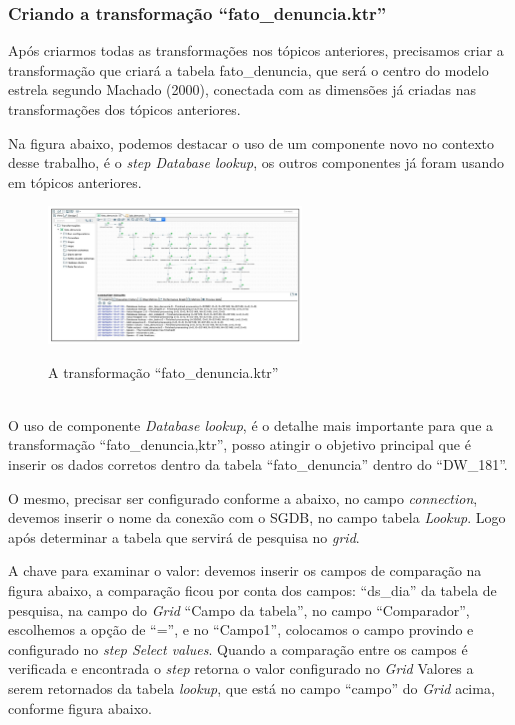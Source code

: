 \subsubsection{Criando a transforma\c{c}\~{a}o ``fato\_denuncia.ktr''}

Ap\'os criarmos todas as transforma\c{c}\~{o}es nos t\'opicos anteriores, precisamos criar a transforma\c{c}\~{a}o que criar\'{a} a tabela fato\_denuncia, que ser\'{a} o centro do modelo estrela segundo Machado (2000), conectada com as dimens\~{o}es j\'{a} criadas nas transforma\c{c}\~{o}es dos t\'opicos anteriores.

Na figura abaixo, podemos destacar o uso de um componente novo no contexto desse trabalho, \'{e} o 
\textit{step Database lookup}, os outros componentes j\'{a} foram usando em t\'opicos anteriores.

\begin{figure}[H]
	\vspace*{0,2cm}
    \centering
    \caption{A transforma\c{c}\~{a}o ``fato\_denuncia.ktr''}
    \includegraphics[width=0.6\textwidth]{./04-figuras/figura-fato}
    \label{fig:ilustfigfato}
\end{figure}
\vspace*{-0,9cm}
{\raggedright {}} \\

O uso de componente \textit{Database lookup}, \'{e} o detalhe mais importante para que a transforma\c{c}\~{a}o 
``fato\_denuncia,ktr'', posso atingir o objetivo principal que \'{e} inserir os dados corretos dentro da tabela 
``fato\_denuncia'' dentro do ``DW\_181''. 

O mesmo, precisar ser configurado conforme a abaixo, no campo \textit{connection}, devemos inserir o 
nome da conex\~{a}o com o SGDB, no campo tabela \textit{Lookup}. Logo ap\'{o}s determinar a tabela que servir\'{a} de 
pesquisa no \textit{grid}.

A chave para examinar o valor: devemos inserir os campos de compara\c{c}\~{a}o na 
figura abaixo, a compara\c{c}\~{a}o ficou por conta dos campos: ``ds\_dia''  da tabela de pesquisa, na campo do 
\textit{Grid} ``Campo da tabela'', no campo ``Comparador'', escolhemos a op\c{c}\~{a}o de ``='', e no 
``Campo1'', colocamos o campo provindo e configurado no \textit{step Select values}. Quando a compara\c{c}\~{a}o 
entre os campos \'{e} verificada e encontrada o \textit{step} retorna o valor configurado no \textit{Grid} Valores a serem 
retornados da tabela \textit{lookup}, que est\'{a} no campo ``campo'' do \textit{Grid} acima, conforme figura abaixo.

